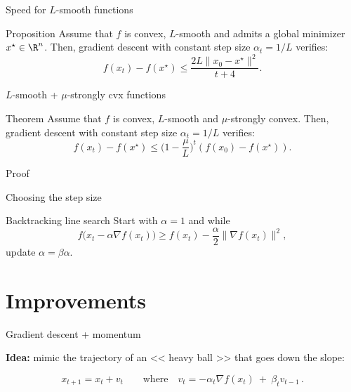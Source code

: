 \documentclass{beamer}
\begin{document}
\begin{frame}[t]{Speed for $L$-smooth functions}
	\grid

	\vspace{-0.4cm}
	\begin{block}{Proposition}
		Assume that $f$ is convex, $L$-smooth and admits a global minimizer $x^{\star} \in \R^n$.
		Then, gradient descent with constant step size $\alpha_t = 1/L$ verifies:
		$$
		f(x_t) - f(x^{\star}) \leq \frac{2 L \|x_0 - x^{\star}\|^2}{t+4}.
		$$
	\end{block}
\end{frame}

\begin{frame}[t]{$L$-smooth + $\mu$-strongly cvx functions}
	\grid

	\vspace{-0.4cm}
	\begin{block}{Theorem}
		Assume that $f$ is convex, $L$-smooth and $\mu$-strongly convex.
		Then, gradient descent with constant step size $\alpha_t = 1/L$ verifies:
		$$
		f(x_t) - f(x^{\star}) \leq \Big(1 - \frac{\mu}{L} \Big)^t (f(x_0) - f(x^{\star})).
		$$
	\end{block}
\end{frame}

\begin{frame}[t]{Proof}
	\grid

\end{frame}


\begin{frame}[t]{Choosing the step size}
	\grid

	\begin{block}{Backtracking line search}
		Start with $\alpha = 1$ and while
		$$
		f\big(x_t - \alpha \nabla f(x_t) \big) \geq f(x_t) - \frac{\alpha}{2} \|\nabla f(x_t) \|^2,
		$$
		update $\alpha = \beta \alpha$.
	\end{block}
\end{frame}



\section{Improvements}



\begin{frame}[t]{Gradient descent + momentum}
	\grid

	\textbf{Idea:} mimic the trajectory of an << heavy ball >> that goes down the slope:
	\vspace{-0.3cm}
	\begin{exampleblock}{}
		\vspace{-0.3cm}
		$$
		x_{t+1} = x_t + v_t \qquad \text{where} \quad v_t = - \alpha_t \nabla f(x_t)  \ + \ \beta_t v_{t-1} \,.
		$$
	\end{exampleblock}

\end{frame}
\end{document}
